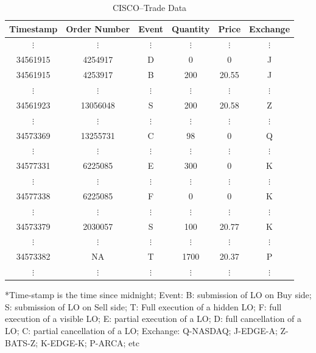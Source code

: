 	\begin{table}[!ht]
   	\centering
   	\caption{CISCO--Trade Data \label{tab:CISCO}}
   	\hspace{-1cm}\begin{tabular}{cccccc} 
	Timestamp & Order Number & Event & Quantity & Price & Exchange \\ \hline
	$\vdots$ & $\vdots$ & $\vdots$ & $\vdots$ & $\vdots$ & $\vdots$ \\
	34561915 & 4254917 & D & 0 & 0 & J \\
	34561915 & 4253917 & B & 200 & 20.55 & J \\
	$\vdots$ & $\vdots$ & $\vdots$ & $\vdots$ & $\vdots$ & $\vdots$ \\
	34561923 & 13056048 & S & 200 & 20.58 & Z \\
	$\vdots$ & $\vdots$ & $\vdots$ & $\vdots$ & $\vdots$ & $\vdots$ \\
	34573369 & 13255731 & C & 98 & 0 & Q \\
	$\vdots$ & $\vdots$ & $\vdots$ & $\vdots$ & $\vdots$ & $\vdots$ \\
	34577331 & 6225085 & E & 300 & 0 & K \\
	$\vdots$ & $\vdots$ & $\vdots$ & $\vdots$ & $\vdots$ & $\vdots$ \\
	34577338 & 6225085 & F & 0 & 0 & K \\
	$\vdots$ & $\vdots$ & $\vdots$ & $\vdots$ & $\vdots$ & $\vdots$ \\
	34573379 & 2030057 & S & 100 & 20.77 & K \\
	$\vdots$ & $\vdots$ & $\vdots$ & $\vdots$ & $\vdots$ & $\vdots$ \\
	34573382 & NA & T & 1700 & 20.37 & P \\
	$\vdots$ & $\vdots$ & $\vdots$ & $\vdots$ & $\vdots$ & $\vdots$ 
   	\end{tabular}
	\begin{minipage}[t]{1\textwidth}
	\small{*Time-stamp is the time since midnight; Event: B: submission of LO on Buy side; S: submission of LO on Sell side; T: Full execution of a hidden LO; F: full execution of a visible LO; E: partial execution of a LO; D: full cancellation of a LO; C: partial cancellation of a LO; Exchange: Q-NASDAQ; J-EDGE-A; Z-BATS-Z; K-EDGE-K; P-ARCA; etc}
	\end{minipage}
	\end{table}


